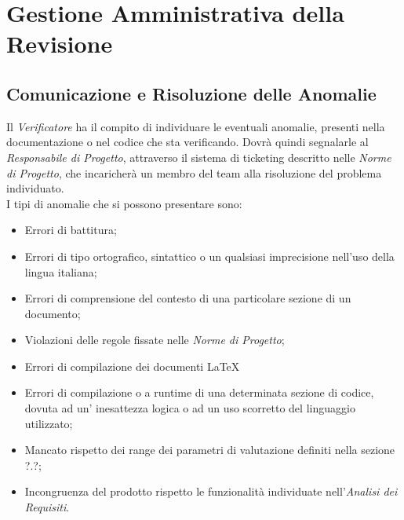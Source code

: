 \newpage
\section{Gestione Amministrativa della Revisione}

\subsection{Comunicazione e Risoluzione delle Anomalie}
Il \textit{Verificatore} ha il compito di individuare le eventuali anomalie, presenti nella documentazione o nel codice che sta verificando. Dovrà quindi segnalarle al \textit{Responsabile di Progetto}, attraverso il sistema di ticketing descritto nelle \textit{Norme di Progetto}, che incaricherà un membro del team alla risoluzione del problema individuato.\\ I tipi di anomalie che si possono presentare sono:
\begin{itemize} 
\item Errori di battitura;
\item Errori di tipo ortografico, sintattico o un qualsiasi imprecisione nell'uso della lingua italiana; 
\item Errori di comprensione del contesto di una particolare sezione di un documento;
\item Violazioni delle regole fissate nelle \textit{Norme di Progetto};
\item Errori di compilazione dei documenti \LaTeX~
\item Errori di compilazione o a runtime di una determinata sezione di codice, dovuta ad un' inesattezza logica o ad un uso scorretto del linguaggio utilizzato; 
\item Mancato rispetto dei range dei parametri di valutazione definiti nella sezione ?.?;
\item Incongruenza del prodotto rispetto le funzionalità individuate nell’\textit{Analisi dei Requisiti}.
\end{itemize}
